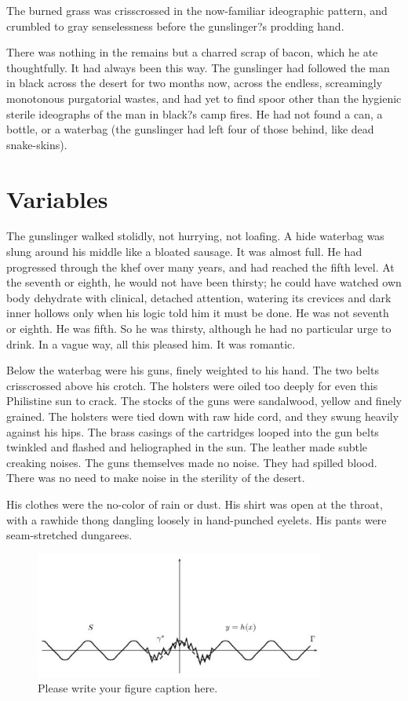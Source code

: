 \documentclass[
11pt,%
tightenlines,%
twoside,%
onecolumn,%
nofloats,%
nobibnotes,%
nofootinbib,%
superscriptaddress,%
noshowpacs,%
centertags]%
{revtex4}
\begin{document}
The burned grass was crisscrossed in the now-familiar ideographic pattern, and crumbled to gray senselessness before the gunslinger?s prodding hand. 

There was nothing in the remains but a charred scrap of bacon, which he ate thoughtfully. It had always been this way. The gunslinger had followed the man in black across the desert for two months now, across the endless, screamingly monotonous purgatorial wastes, and had yet to find spoor other than the hygienic sterile ideographs of the man in black?s camp fires. He had not found a can, a bottle, or a waterbag (the gunslinger had left four of those behind, like dead snake-skins).

\section{Variables}

The gunslinger walked stolidly, not hurrying, not loafing. A hide waterbag was slung around his middle like a bloated sausage. It was almost full. He had progressed through the khef over many years, and had reached the fifth level. At the seventh or eighth, he would not have been thirsty; he could have watched own body dehydrate with clinical, detached attention, watering its crevices and dark inner hollows only when his logic told him it must be done. He was not seventh or eighth. He was fifth. So he was thirsty, although he had no particular urge to drink. In a vague way, all this pleased him. It was romantic.

Below the waterbag were his guns, finely weighted to his hand. The two belts crisscrossed above his crotch. The holsters were oiled too deeply for even this Philistine sun to crack. The stocks of the guns were sandalwood, yellow and finely grained. The holsters were tied down with raw hide cord, and they swung heavily against his hips. The brass casings of the cartridges looped into the gun belts twinkled and flashed and heliographed in the sun. The leather made subtle creaking noises. The guns themselves made no noise. They had spilled blood. There was no need to make noise in the sterility of the desert.

His clothes were the no-color of rain or dust. His shirt was open at the throat, with a rawhide thong dangling loosely in hand-punched eyelets. His pants were seam-stretched dungarees.

\begin{figure}[h]
\setcaptionmargin{5mm}
\onelinecaptionstrue  %
\includegraphics[width=0.85\textwidth]{deform.eps}
\caption{Please write your figure caption here.}\label{fig:1}
\end{figure}
\end{document}
